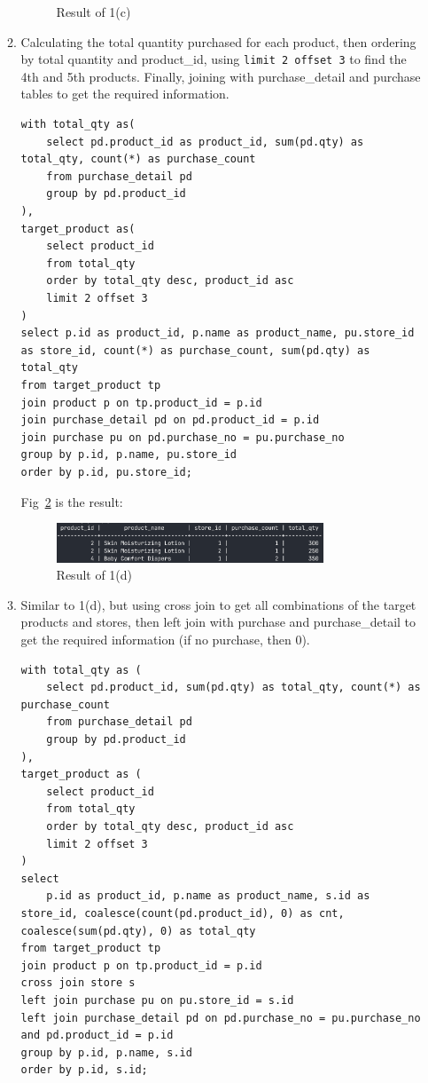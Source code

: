 \documentclass[12pt,a4paper]{article}
\begin{document}
\begin{enumerate}
\begin{enumerate}
\begin{figure}[H]
            \caption{Result of 1(c)}
            \label{fig:1c}
        \end{figure}
        \item Calculating the total quantity purchased for each product, then ordering by total quantity and product\_id, using \texttt{limit 2 offset 3} to find the 4th and 5th products. Finally, joining with purchase\_detail and purchase tables to get the required information.
        \begin{verbatim}
with total_qty as(
    select pd.product_id as product_id, sum(pd.qty) as total_qty, count(*) as purchase_count
    from purchase_detail pd
    group by pd.product_id
),
target_product as(
    select product_id
    from total_qty
    order by total_qty desc, product_id asc
    limit 2 offset 3
)
select p.id as product_id, p.name as product_name, pu.store_id as store_id, count(*) as purchase_count, sum(pd.qty) as total_qty
from target_product tp
join product p on tp.product_id = p.id
join purchase_detail pd on pd.product_id = p.id
join purchase pu on pd.purchase_no = pu.purchase_no
group by p.id, p.name, pu.store_id
order by p.id, pu.store_id;
        \end{verbatim}
        Fig~\ref{fig:1d} is the result:
        \begin{figure}[H]
            \centering
            \includegraphics[width=0.8\textwidth]{src/1d.png}
            \caption{Result of 1(d)}
            \label{fig:1d}
        \end{figure}
        \item Similar to 1(d), but using cross join to get all combinations of the target products and stores, then left join with purchase and purchase\_detail to get the required information (if no purchase, then 0).
        \begin{verbatim}
with total_qty as (
    select pd.product_id, sum(pd.qty) as total_qty, count(*) as purchase_count
    from purchase_detail pd
    group by pd.product_id
),
target_product as (
    select product_id
    from total_qty
    order by total_qty desc, product_id asc
    limit 2 offset 3
)
select 
    p.id as product_id, p.name as product_name, s.id as store_id, coalesce(count(pd.product_id), 0) as cnt, coalesce(sum(pd.qty), 0) as total_qty
from target_product tp
join product p on tp.product_id = p.id
cross join store s
left join purchase pu on pu.store_id = s.id
left join purchase_detail pd on pd.purchase_no = pu.purchase_no and pd.product_id = p.id
group by p.id, p.name, s.id
order by p.id, s.id;
        

\end{verbatim}
\end{enumerate}
\end{enumerate}
\end{document}
